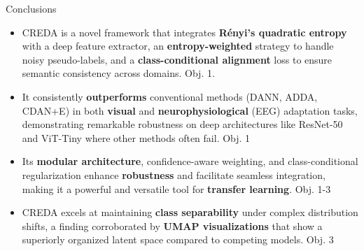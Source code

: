 \documentclass[aspectratio=169]{beamer}
\begin{document}
\begin{frame}{Conclusions}
\small
\begin{itemize}
    \setlength\itemsep{1em}

    \item CREDA is a novel framework that integrates \textbf{Rényi's quadratic entropy} with a deep feature extractor, an \textbf{entropy-weighted} strategy to handle noisy pseudo-labels, and a \textbf{class-conditional alignment} loss to ensure semantic consistency across domains. Obj. 1.

    \item It consistently \textbf{outperforms} conventional methods (DANN, ADDA, CDAN+E) in both \textbf{visual} and \textbf{neurophysiological} (EEG) adaptation tasks, demonstrating remarkable robustness on deep architectures like ResNet-50 and ViT-Tiny where other methods often fail. Obj. 1

    \item Its \textbf{modular architecture}, confidence-aware weighting, and class-conditional regularization enhance \textbf{robustness} and facilitate seamless integration, making it a powerful and versatile tool for \textbf{transfer learning}. Obj. 1-3
    
    \item CREDA excels at maintaining \textbf{class separability} under complex distribution shifts, a finding corroborated by \textbf{UMAP visualizations} that show a superiorly organized latent space compared to competing models. Obj. 3

    
    
\end{itemize}
\end{frame}
\end{document}
